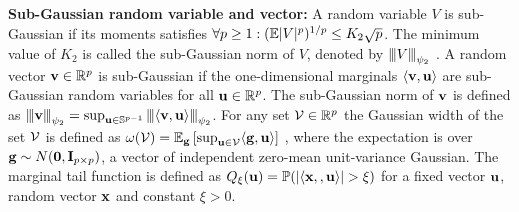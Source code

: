 \textbf{Sub-Gaussian random variable and vector:}
A random variable $V$ is sub-Gaussian if its moments satisfies $\forall p \geq 1: (\mathbb{E} |V|^p )^{1/p} \leq K_2 \sqrt{p}$.
The minimum value of $K_2$ is called the sub-Gaussian  norm of $V$, denoted by ${\left\vert\kern-0.25ex\left\vert\kern-0.25ex\left\vert V \right\vert\kern-0.25ex\right\vert\kern-0.25ex\right\vert}_{\psi_2}$ \cite{vers12}.
A random vector $\mathbf{v} \in \mathbb R^p$ is sub-Gaussian if the one-dimensional marginals $\langle \mathbf{v}, \mathbf{u} \rangle$ are sub-Gaussian random variables for all $\mathbf{u} \in \mathbb R^p$. The sub-Gaussian norm of $\mathbf{v}$ is defined \cite{vers12} as ${\left\vert\kern-0.25ex\left\vert\kern-0.25ex\left\vert \mathbf{v} \right\vert\kern-0.25ex\right\vert\kern-0.25ex\right\vert}_{\psi_2} = \sup_{\mathbf{u} \in \mathbb S^{p-1}} {\left\vert\kern-0.25ex\left\vert\kern-0.25ex\left\vert \langle \mathbf{v}, \mathbf{u} \rangle \right\vert\kern-0.25ex\right\vert\kern-0.25ex\right\vert}_{\psi_2}$.
For any set $\cV \in \reals^p$ the Gaussian width of the set $\cV$ is defined as $\omega(\cV) = \ex_\g \left[ \sup_{\u \in \cV} \langle \g, \u \rangle \right]$ \cite{vershynin2018high}, where the expectation is over $\mathbf{g} \sim N(\mathbf{0}, \mathbf{I}_{p \times p})$, a vector of independent zero-mean unit-variance Gaussian. The marginal tail function is defined as $Q_{\xi}(\mathbf{u}) = \mathbb{P}(|\langle \mathbf{x}, , \mathbf{u} \rangle| > \xi)$ for a fixed vector $\mathbf{u}$, random vector $\mathbf{x}$ and constant $\xi > 0$. 




